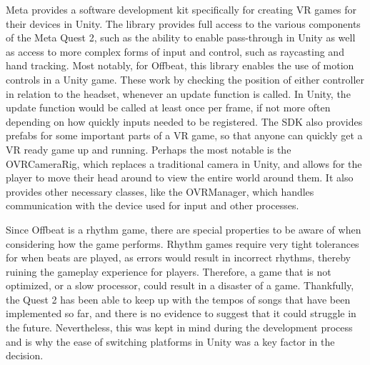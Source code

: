 \documentclass[10pt,twocolumn]{article}
\begin{document}
Meta provides a software development kit specifically for creating VR games for their devices in Unity\cite{OculusSDK}. The library provides full access to the various components of the Meta Quest 2, such as the ability to enable pass-through in Unity as well as access to more complex forms of input and control, such as raycasting and hand tracking. Most notably, for Offbeat, this library enables the use of motion controls in a Unity game. These work by checking the position of either controller in relation to the headset, whenever an update function is called. In Unity, the update function would be called at least once per frame, if not more often depending on how quickly inputs needed to be registered. The SDK also provides prefabs for some important parts of a VR game, so that anyone can quickly get a VR ready game up and running. Perhaps the most notable is the OVRCameraRig, which replaces a traditional camera in Unity, and allows for the player to move their head around to view the entire world around them. It also provides other necessary classes, like the OVRManager, which handles communication with the device used for input and other processes.

Since Offbeat is a rhythm game, there are special properties to be aware of when considering how the game performs. Rhythm games require very tight tolerances for when beats are played, as errors would result in incorrect rhythms, thereby ruining the gameplay experience for players. Therefore, a game that is not optimized, or a slow processor, could result in a disaster of a game. Thankfully, the Quest 2 has been able to keep up with the tempos of songs that have been implemented so far, and there is no evidence to suggest that it could struggle in the future. Nevertheless, this was kept in mind during the development process and is why the ease of switching platforms in Unity was a key factor in the decision.
\end{document}
